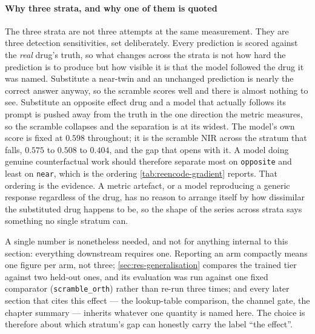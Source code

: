 \paragraph{Why three strata, and why one of them is quoted} The three strata are
not three attempts at the same measurement. They are three detection
sensitivities, set deliberately. Every prediction is scored against the
\emph{real} drug's truth, so what changes across the strata is not how hard the
prediction is to produce but how visible it is that the model followed the drug
it was named. Substitute a near-twin and an unchanged prediction is nearly the
correct answer anyway, so the scramble scores well and there is almost nothing
to see. Substitute an opposite effect drug and a model that actually follows its
prompt is pushed away from the truth in the one direction the metric measures,
so the scramble collapses and the separation is at its widest. The model's own
score is fixed at $0.598$ throughout; it is the scramble NIR across the stratum that falls, $0.575$
to $0.508$ to $0.404$, and the gap that opens with it. A model doing genuine
counterfactual work should therefore separate most on \texttt{opposite} and
least on \texttt{near}, which is the ordering \cref{tab:reencode-gradient}
reports. That ordering is the evidence. A metric artefact, or a model
reproducing a generic response regardless of the drug, has no reason to arrange
itself by how dissimilar the substituted drug happens to be, so the shape of the
series across strata says something no single stratum can.

A single number is nonetheless needed, and not for anything internal to this
section: everything downstream requires one. Reporting an arm compactly means one figure per
arm, not three; \cref{sec:res-generalisation} compares the trained tier against
two held-out ones, and its evaluation was run against one fixed comparator
(\texttt{scramble\_orth}) rather than re-run three times; and every later section
that cites this effect --- the lookup-table comparison, the channel gate, the
chapter summary --- inherits whatever one quantity is named here. The choice is
therefore about which stratum's gap can honestly carry the label ``the effect''.

